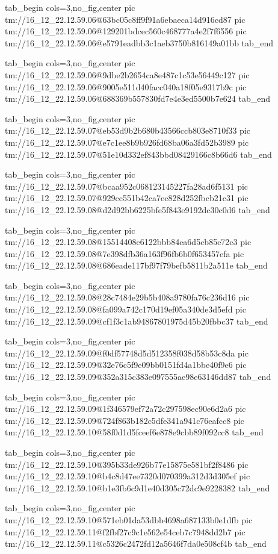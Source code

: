 \ifcmt
  tab_begin cols=3,no_fig,center
    pic tm://16_12_22.12.59.06@63bc05c8ff9f91a6ebaeca14d916cd87
    pic tm://16_12_22.12.59.06@129201bdcec560c468777a4e2f7f6556
    pic tm://16_12_22.12.59.06@e5791eadbb3c1aeb3750b816149a01bb
  tab_end
\fi


\ifcmt
  tab_begin cols=3,no_fig,center
    pic tm://16_12_22.12.59.06@9dbe2b2654ca8e487c1c53e56449c127
    pic tm://16_12_22.12.59.06@9005e511d40facc040a18f05e9317b9c
    pic tm://16_12_22.12.59.06@688369b557830fd7e4e3ed5500b7e624
  tab_end
\fi


\ifcmt
  tab_begin cols=3,no_fig,center
    pic tm://16_12_22.12.59.07@eb53d9b2b680b43566ccb803e8710f33
    pic tm://16_12_22.12.59.07@e7c1ee8b9b926fd68ba06a3fd52b3989
    pic tm://16_12_22.12.59.07@51e10d332ef843bbd08429166c8b66d6
  tab_end
\fi


\ifcmt
  tab_begin cols=3,no_fig,center
    pic tm://16_12_22.12.59.07@bcaa952c068123145227fa28ad6f5131
    pic tm://16_12_22.12.59.07@929cc551b42ca7ec828d252fbcb21c31
    pic tm://16_12_22.12.59.08@d2d92bb6225bfe5f843e9192dc30c0d6
  tab_end
\fi


\ifcmt
  tab_begin cols=3,no_fig,center
    pic tm://16_12_22.12.59.08@15514408e6122bbb84ea6d5cb85e72c3
    pic tm://16_12_22.12.59.08@7e398dfb36a163f96fb6b0f653457efa
    pic tm://16_12_22.12.59.08@686eade117bf97f79befb5811b2a511e
  tab_end
\fi


\ifcmt
  tab_begin cols=3,no_fig,center
    pic tm://16_12_22.12.59.08@28c7484e29b5b408a9780fa76c236d16
    pic tm://16_12_22.12.59.08@fa099a742c170d19ef05a340de3d5efd
    pic tm://16_12_22.12.59.09@cf1f3c1ab94867801975d45b20fbbc37
  tab_end
\fi


\ifcmt
  tab_begin cols=3,no_fig,center
    pic tm://16_12_22.12.59.09@f0df57748d5d512358f038d58b53c8da
    pic tm://16_12_22.12.59.09@32e76c5f9e09bb0151fd4a1bbe40f9e6
    pic tm://16_12_22.12.59.09@352a315c383e097555ae98e63146dd87
  tab_end
\fi


\ifcmt
  tab_begin cols=3,no_fig,center
    pic tm://16_12_22.12.59.09@1f346579ef72a72c297598ec90e6d2a6
    pic tm://16_12_22.12.59.09@724f863b182c5dfe341a941c76eafcc8
    pic tm://16_12_22.12.59.10@58f0d1d5fceef6e878e9cbb89f092cc8
  tab_end
\fi


\ifcmt
  tab_begin cols=3,no_fig,center
    pic tm://16_12_22.12.59.10@395b33de926b77e15875e581bf2f8486
    pic tm://16_12_22.12.59.10@b4c8d47ee7320d070399a312d3d305ef
    pic tm://16_12_22.12.59.10@b1e3fb6c9d1e40d305c72dc9e9228382
  tab_end
\fi


\ifcmt
  tab_begin cols=3,no_fig,center
    pic tm://16_12_22.12.59.10@571eb01da53dbb4698a687133b0e1dfb
    pic tm://16_12_22.12.59.11@f2fbf27c9c1e562e54ceb7c7948dd2b7
    pic tm://16_12_22.12.59.11@c5326c2472fd12a5646f7da0e508cf4b
  tab_end
\fi


